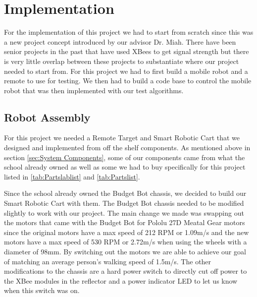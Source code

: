 \chapter{Implementation}
\label{ch: Chapter5}

For the implementation of this project we had to start from scratch since this was a new project concept introduced by our advisor Dr. Miah. There have been senior projects in the past that have used XBees to get signal strength but there is very little overlap between these projects to substantiate where our project needed to start from. For this project we had to first build a mobile robot and a remote to use for testing. We then had to build a code base to control the mobile robot that was then implemented with our test algorithms.

\section{Robot Assembly}
\label{sec:Robot Assembly}

For this project we needed a Remote Target and Smart Robotic Cart that we designed and implemented from off the shelf components.  As mentioned above in section \ref{sec:System Components}, some of our components came from what the school already owned as well as some we had to buy specifically for this project listed in \autoref{tab:Partslablist} and \autoref{tab:Partslist}.

\vspace*{12pt}
\noindent
Since the school already owned the Budget Bot chassis, we decided to build our Smart Robotic Cart with them. The Budget Bot chassis needed to be modified slightly to work with our project. The main change we made was swapping out the motors that came with the Budget Bot for Pololu 27D Meatal Gear motors since the original motors have a max speed of 212 RPM or 1.09m/s and the new motors have a max speed of 530 RPM or 2.72m/s when using the wheels with a diameter of 98mm. By switching out the motors we are able to achieve our goal of matching an average person's walking speed of 1.5m/s. The other modifications to the chassis are a hard power switch to directly cut off power to the XBee modules in the reflector and a power indicator LED to let us know when this switch was on.

